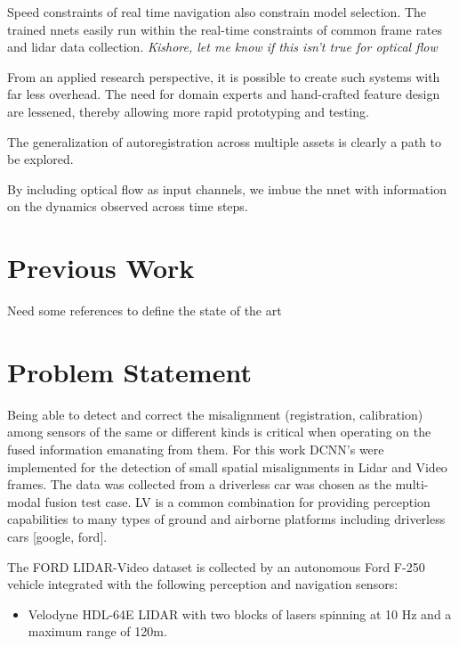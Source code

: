 \documentclass{article}
\begin{document}
Speed constraints of real time navigation also constrain model selection. The trained nnets easily run within the real-time constraints of common frame rates and lidar data collection. \emph{Kishore, let me know if this isn't true for optical flow}

From an applied research perspective, it is possible to create such systems with far less overhead. The need for domain experts and hand-crafted feature design are lessened, thereby allowing more rapid prototyping and testing. 

The generalization of autoregistration across multiple assets is clearly a path to be explored. 

By including optical flow as input channels, we imbue the nnet with information on the dynamics observed across time steps. 

\section{Previous Work} %
\label{sec:previous_work}
Need some references to define the state of the art 




\section{Problem Statement} %
\label{sec:problem_statement}

Being able to detect and correct the misalignment (registration, calibration) among sensors of the same or different kinds is critical when operating on the fused information emanating from them. For this work DCNN's were implemented for the detection of small spatial misalignments in Lidar and Video frames. The data was collected from a driverless car was chosen as the multi-modal fusion test case. LV is a common combination for providing perception capabilities to many types of ground and airborne platforms including driverless cars [google, ford]. 

The FORD LIDAR-Video dataset \cite{Pandey2011Ford-campu} is collected by an autonomous Ford F-250 vehicle integrated with the following perception and navigation sensors:
\begin{itemize}
    \item Velodyne HDL-64E LIDAR with two blocks of lasers spinning at 10 Hz and a maximum range of 120m.
\end{itemize}
\end{document}

